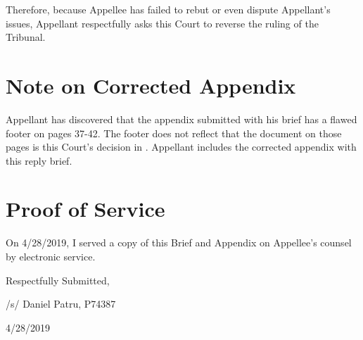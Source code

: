 \documentclass[12pt,\documentclassflag]{michiganCourtOfAppealsBrief}
\begin{document}
Therefore, because Appellee has failed to rebut or even dispute Appellant's issues, Appellant respectfully asks this Court to reverse the ruling of the Tribunal.

\section{Note on Corrected Appendix}

Appellant has discovered that the appendix submitted with his brief has a flawed footer on pages 37-42. The footer does not reflect that the document on those pages is this Court's decision in \cite{Patru}. Appellant includes the corrected appendix with this reply brief.

\section{Proof of Service}

On 4/28/2019, I served a copy of this Brief and Appendix on Appellee's counsel by electronic service.

\vspace{1\baselineskip}

{ \setlength{\leftskip}{3.5in}

  Respectfully Submitted,

  /s/ Daniel Patru, P74387

  4/28/2019

  \setlength{\leftskip}{0pt}}

\newpage\empty%
\end{document}

